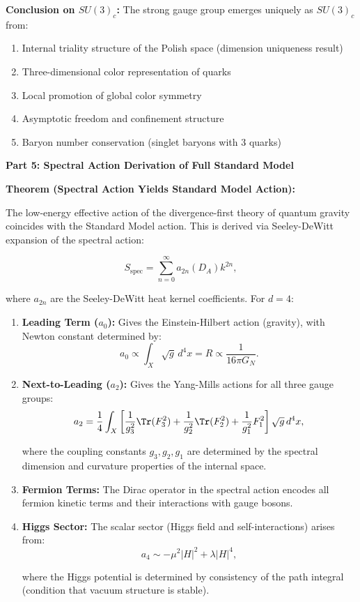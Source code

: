 \textbf{Conclusion on $SU(3)_c$:} The strong gauge group emerges uniquely as $SU(3)_c$ from:
\begin{enumerate}
\item Internal triality structure of the Polish space (dimension uniqueness result)
\item Three-dimensional color representation of quarks
\item Local promotion of global color symmetry
\item Asymptotic freedom and confinement structure
\item Baryon number conservation (singlet baryons with 3 quarks)
\end{enumerate}

\textbf{Part 5: Spectral Action Derivation of Full Standard Model}

\textbf{Theorem (Spectral Action Yields Standard Model Action):}

The low-energy effective action of the divergence-first theory of quantum gravity coincides with the Standard Model action. This is derived via Seeley-DeWitt expansion of the spectral action:

\begin{equation}
\label{eq:spectralActionExpansion}
S_{\text{spec}} = \sum_{n=0}^{\infty} a_{2n}(D_A) k^{2n},
\end{equation}

where $a_{2n}$ are the Seeley-DeWitt heat kernel coefficients. For $d = 4$:

\begin{enumerate}
\item \textbf{Leading Term ($a_0$):} Gives the Einstein-Hilbert action (gravity), with Newton constant determined by:
\begin{equation}
a_0 \propto \int_X \sqrt{g} \, d^4x = R \propto \frac{1}{16\pi G_N}.
\end{equation}

\item \textbf{Next-to-Leading ($a_2$):} Gives the Yang-Mills actions for all three gauge groups:
\begin{equation}
a_2 = \frac{1}{4}\int_X \left[\frac{1}{g_3^2}\Tr(F_3^2) + \frac{1}{g_2^2}\Tr(F_2^2) + \frac{1}{g_1^2}F_1^2\right]\sqrt{g} \, d^4x,
\end{equation}

where the coupling constants $g_3, g_2, g_1$ are determined by the spectral dimension and curvature properties of the internal space.

\item \textbf{Fermion Terms:} The Dirac operator in the spectral action encodes all fermion kinetic terms and their interactions with gauge bosons.

\item \textbf{Higgs Sector:} The scalar sector (Higgs field and self-interactions) arises from:
\begin{equation}
a_4 \sim -\mu^2 |H|^2 + \lambda |H|^4,
\end{equation}

where the Higgs potential is determined by consistency of the path integral (condition that vacuum structure is stable).
\end{enumerate}

